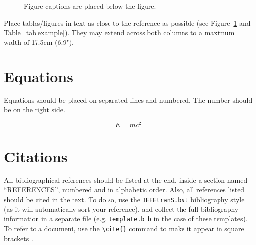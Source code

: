 \documentclass[twoside,10pt]{article}
\begin{document}
\begin{figure}[htbp]
\centerline{}
\caption{Figure captions are placed below the figure.}
\label{fig:example}
\end{figure}
Place tables/figures in text as close to the reference as possible
(see Figure~\ref{fig:example} and Table~\ref{tab:example}). They may extend
across both columns to a maximum width of 17.5cm (6.9").

\section{Equations}

Equations should be placed on separated lines and numbered.
The number should be on the right side.

\begin{equation}
E=mc^{2}
\end{equation}

\section{Citations}

All bibliographical references should be listed at the
end, inside a section named ``REFERENCES'', numbered
and in alphabetic order. Also, all
references listed should be cited in the text.
To do so, use the \texttt{IEEEtranS.bst} bibliography 
style (as it will automatically sort your reference), and 
collect the full bibliography information in a separate 
file (e.g. \texttt{template.bib} in the case of these 
templates).
To refer to a document, use the \verb+\cite{}+ command 
to make it appear in square brackets \cite{Someone:02,Author:00}.
\end{document}
